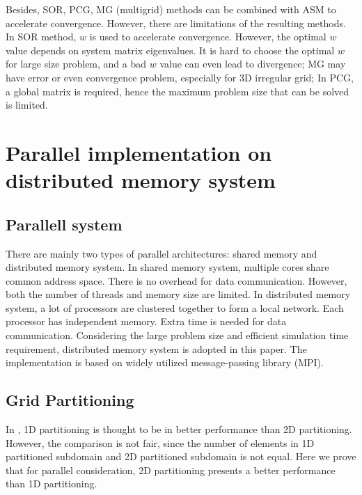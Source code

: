 \documentclass{sig-alternate}
\begin{document}
	Besides, SOR, PCG, MG (multigrid) methods can be combined with ASM to accelerate convergence. However, there are limitations of 
	the resulting
	methods. In SOR method, $w$ is used to accelerate convergence. However, the optimal $w$ value depends on system matrix 
	eigenvalues. It is hard to choose the optimal $w$ for large
	size problem, and a bad $w$ value can even lead to divergence; MG may have
	error or even convergence problem, especially for 3D irregular grid; In PCG, a global
	matrix is required, hence the maximum problem size that can be solved is limited.
\section{Parallel implementation on \\distributed memory system}
  \subsection{Parallell system}
	There are mainly two types of parallel architectures: shared memory and distributed memory system. In shared 
	memory system, 
	multiple cores share common address space. There is no overhead for data communication. However, both the number
	of threads and memory size are limited. In distributed 
	memory system, a lot of processors are clustered together to form a local network. Each processor has independent memory. 
	Extra time is needed for data communication. Considering the large problem 
	size and efficient simulation time requirement, distributed memory system is adopted in this paper. The implementation is based
	on widely utilized message-passing library (MPI).
  \subsection{Grid Partitioning}
	In \cite{Zhongyu}, 1D partitioning is thought to be in better performance than 2D partitioning. However, the comparison is not 
	fair, since the number of elements in 1D partitioned subdomain and 2D partitioned subdomain is not equal. Here we prove that
	for parallel consideration, 2D partitioning presents a better performance than 1D partitioning. 
\end{document}
